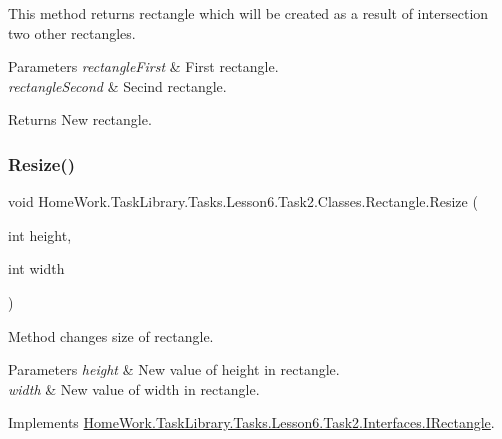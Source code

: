 This method returns rectangle which will be created as a result of intersection two other rectangles. 


\begin{DoxyParams}{Parameters}
{\em rectangle\+First} & First rectangle.\\
\hline
{\em rectangle\+Second} & Secind rectangle.\\
\hline
\end{DoxyParams}
\begin{DoxyReturn}{Returns}
New rectangle.
\end{DoxyReturn}
\mbox{\label{class_home_work_1_1_task_library_1_1_tasks_1_1_lesson6_1_1_task2_1_1_classes_1_1_rectangle_a6f52dae1798b1343f1d95d4e64d4417f}} 
\subsubsection{\texorpdfstring{Resize()}{Resize()}}
{\footnotesize\ttfamily void Home\+Work.\+Task\+Library.\+Tasks.\+Lesson6.\+Task2.\+Classes.\+Rectangle.\+Resize (\begin{DoxyParamCaption}\item[{int}]{height,  }\item[{int}]{width }\end{DoxyParamCaption})}



Method changes size of rectangle. 


\begin{DoxyParams}{Parameters}
{\em height} & New value of height in rectangle.\\
\hline
{\em width} & New value of width in rectangle.\\
\hline
\end{DoxyParams}


Implements \mbox{\hyperlink{interface_home_work_1_1_task_library_1_1_tasks_1_1_lesson6_1_1_task2_1_1_interfaces_1_1_i_rectangle_a483c0de899c9d29069b8ab9434d7e060}{Home\+Work.\+Task\+Library.\+Tasks.\+Lesson6.\+Task2.\+Interfaces.\+I\+Rectangle}}.

\mbox{\label{class_home_work_1_1_task_library_1_1_tasks_1_1_lesson6_1_1_task2_1_1_classes_1_1_rectangle_a1a9bd6446fcc822b4c000beb394d8eb6}} 
